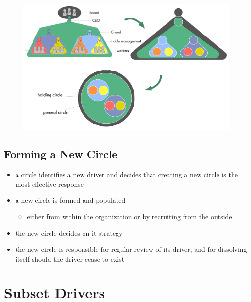 \begin{figure}[htbp]
\centering
\includegraphics[keepaspectratio,width=\textwidth,height=0.75\textheight]{img/structure/hierarchy-domains.png}
\end{figure}

\subsection{Forming a New Circle}
\label{forminganewcircle}

\begin{itemize}
\item a circle identifies a new driver and decides that creating a new circle is the most effective response

\item a new circle is formed and populated

\begin{itemize}
\item either from within the organization or by recruiting from the outside

\end{itemize}

\item the new circle decides on it strategy

\item the new circle is responsible for regular review of its driver, and for dissolving itself should the driver cease to exist

\end{itemize}

\section{Subset Drivers}
\label{subsetdrivers}

